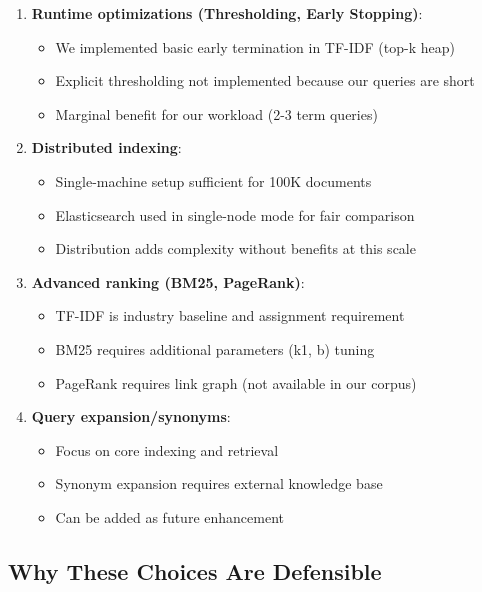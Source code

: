 \documentclass[12pt,a4paper]{article}
\begin{document}
\begin{enumerate}
    \item \textbf{Runtime optimizations (Thresholding, Early Stopping)}: 
    \begin{itemize}
        \item We implemented basic early termination in TF-IDF (top-k heap)
        \item Explicit thresholding not implemented because our queries are short
        \item Marginal benefit for our workload (2-3 term queries)
    \end{itemize}
    
    \item \textbf{Distributed indexing}:
    \begin{itemize}
        \item Single-machine setup sufficient for 100K documents
        \item Elasticsearch used in single-node mode for fair comparison
        \item Distribution adds complexity without benefits at this scale
    \end{itemize}
    
    \item \textbf{Advanced ranking (BM25, PageRank)}:
    \begin{itemize}
        \item TF-IDF is industry baseline and assignment requirement
        \item BM25 requires additional parameters (k1, b) tuning
        \item PageRank requires link graph (not available in our corpus)
    \end{itemize}
    
    \item \textbf{Query expansion/synonyms}:
    \begin{itemize}
        \item Focus on core indexing and retrieval
        \item Synonym expansion requires external knowledge base
        \item Can be added as future enhancement
    \end{itemize}
\end{enumerate}

\subsection{Why These Choices Are Defensible}
\end{document}
